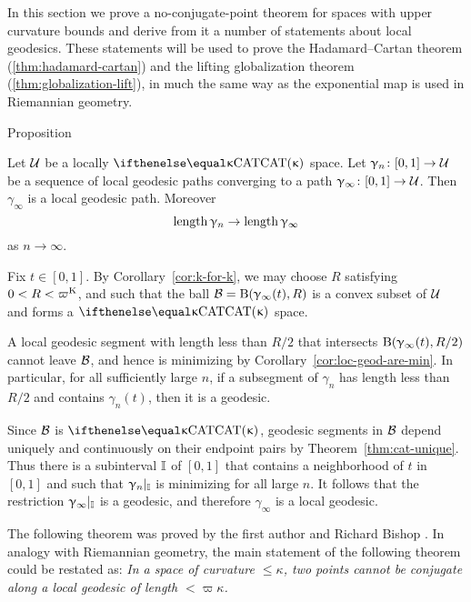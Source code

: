 In this section we prove a no-conjugate-point theorem for spaces with upper curvature bounds and derive from it a number of statements about local geodesics.
These statements will be used to prove the Hadamard--Cartan theorem (\ref{thm:hadamard-cartan}) and the lifting globalization theorem (\ref{thm:globalization-lift}), in much the same way as  the exponential map is used in Riemannian geometry.

\begin{thm}{Proposition}\label{prop:geo-complete}
{\sloppy 
Let $\mathcal{U}$ be a locally $\CAT\kappa$ space.
 Let $\gamma_n\:[0,1]\to\spc{U}$ be a sequence of local geodesic paths converging to a path $\gamma_\infty\:[0,1]\to\spc{U}$.
Then $\gamma_\infty$ is a local geodesic path.
Moreover 
\[\length\gamma_n\to\length\gamma_\infty\]
as $n\to\infty$.

}
\end{thm}

Fix $t\in[0,1]$.
By Corollary~\ref{cor:k-for-k}, we may choose $R$ satisfying $0<R<\varpi\Kappa$,
and such that
the ball $\mathcal{B}=\mathrm{B}{}(\upgamma_\infty(t),R)$ is a convex subset of $\mathcal{U}$ and forms a $\CAT\kappa$ space.

A local geodesic segment  with length less than $R/2$ that intersects $\mathrm{B}{}(\upgamma_\infty(t),R/2)$ cannot leave $\mathcal{B}$, and hence  is  minimizing by Corollary~\ref{cor:loc-geod-are-min}.
In particular, for all sufficiently large $n$, 
if a subsegment of $\gamma_n$ has length less than $R/2$ and contains $\gamma_n(t)$, then it is a geodesic.


Since $\mathcal{B}$ is $\CAT\kappa$, geodesic segments in $\mathcal{B}$ depend uniquely and continuously on their endpoint pairs by Theorem~\ref{thm:cat-unique}.  
Thus there is a subinterval $\mathbb{I}$ of $[0,1]$
that contains a neighborhood of $t$ in $[0,1]$
and such that $\upgamma_n|_{\mathbb{I}}$ is minimizing for all large $n$.
It follows that the restriction $\upgamma_\infty|_{\mathbb{I}}$ is a geodesic,
and therefore $\gamma_\infty$ is a local geodesic.
\qeds


The following theorem was proved by the first author and Richard Bishop \cite{alexander-bishop:h-c}.
In analogy with Riemannian geometry, the main statement of the following theorem could be restated as: 
\textit{In a space of curvature $\le\kappa$, two points cannot be conjugate along a local geodesic of length $<\varpi\kappa$.}


